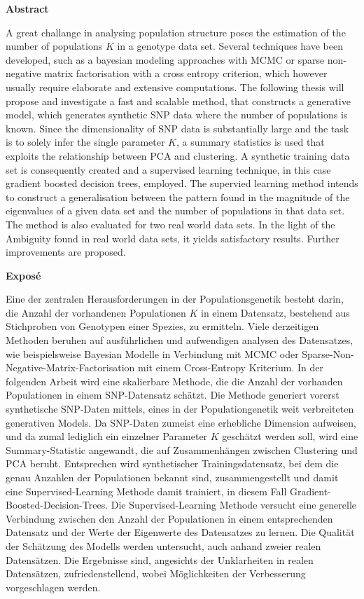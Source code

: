 \documentclass[a4paper, 11pt]{article}
\begin{document}
\thispagestyle{plain}
    \Large
    \textbf{Abstract}\\
    \large
    
A great challange in analysing population structure poses the estimation of the number of populations $K$ in a genotype data set. Several techniques have been developed, such as a bayesian modeling approaches with MCMC or sparse non-negative matrix factorisation with a cross entropy criterion, which however usually require elaborate and extensive computations. The following thesis will propose and investigate a fast and scalable method, that constructs a generative model, which generates synthetic SNP data where the number of populations is known. Since the dimensionality of SNP data is substantially large and the task is to solely infer the single parameter $K$, a summary statistics is used that exploits the relationship between PCA and clustering. A synthetic training data set is consequently created and a supervised learning technique, in this case gradient boosted decision trees, employed.  The supervied learning method intends to construct a generalisation between the pattern found in the magnitude of the eigenvalues of a given data set and the number of populations in that data set. The method is also evaluated for two real world data sets. In the light of the Ambiguity found in real world data sets, it yields satisfactory results. Further improvements are proposed.
    
 
    \vspace{1cm}
    \vfill
    \Large
    \textbf{Exposé}\\
    \large
    
Eine der zentralen Herausforderungen in der Populationsgenetik besteht darin, die Anzahl der vorhandenen Populationen $K$ in einem Datensatz, bestehend aus Stichproben von Genotypen einer Spezies, zu ermitteln. Viele derzeitigen Methoden beruhen auf ausführlichen und aufwendigen analysen des Datensatzes, wie beispielsweise Bayesian Modelle in Verbindung mit MCMC oder Sparse-Non-Negative-Matrix-Factorisation mit einem Cross-Entropy Kriterium. In der folgenden Arbeit wird eine skalierbare Methode, die die Anzahl der vorhanden Populationen in einem SNP-Datensatz schätzt. Die Methode generiert vorerst synthetische SNP-Daten mittels, eines in der Populationgenetik weit verbreiteten generativen Models. Da SNP-Daten zumeist eine erhebliche Dimension aufweisen, und da zumal lediglich ein einzelner Parameter $K$ geschätzt werden soll, wird eine Summary-Statistic angewandt, die auf Zusammenhängen zwischen Clustering und PCA beruht. Entsprechen wird synthetischer Trainingsdatensatz, bei dem die genau Anzahlen der Populationen bekannt sind, zusammengestellt und damit eine Supervised-Learning Methode damit trainiert, in diesem Fall Gradient-Boosted-Decision-Trees. Die Supervised-Learning Methode versucht eine generelle Verbindung zwischen den Anzahl der Populationen in einem entsprechenden Datensatz und der Werte der Eigenwerte des Datensatzes zu lernen. Die Qualität der Schätzung des Modells werden untersucht, auch anhand zweier realen Datensätzen. Die Ergebnisse sind, angesichts der Unklarheiten in realen Datensätzen, zufriedenstellend, wobei Möglichkeiten der Verbesserung vorgeschlagen werden.
\vspace{0.5cm}
\end{document}
